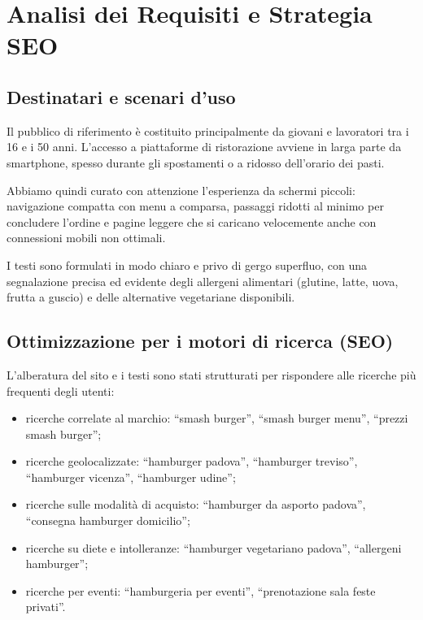\documentclass[a4paper,11pt]{article}
\begin{document}
\section{Analisi dei Requisiti e Strategia SEO}

\subsection{Destinatari e scenari d'uso}
Il pubblico di riferimento è costituito principalmente da giovani e lavoratori tra i 16 e i 50 anni. L'accesso a piattaforme di ristorazione avviene in larga parte da smartphone, spesso durante gli spostamenti o a ridosso dell'orario dei pasti.

Abbiamo quindi curato con attenzione l'esperienza da schermi piccoli: navigazione compatta con menu a comparsa, passaggi ridotti al minimo per concludere l'ordine e pagine leggere che si caricano velocemente anche con connessioni mobili non ottimali.

I testi sono formulati in modo chiaro e privo di gergo superfluo, con una segnalazione precisa ed evidente degli allergeni alimentari (glutine, latte, uova, frutta a guscio) e delle alternative vegetariane disponibili.

\subsection{Ottimizzazione per i motori di ricerca (SEO)}
L'alberatura del sito e i testi sono stati strutturati per rispondere alle ricerche più frequenti degli utenti:
\begin{itemize}
    \item ricerche correlate al marchio: ``smash burger'', ``smash burger menu'', ``prezzi smash burger'';
    \item ricerche geolocalizzate: ``hamburger padova'', ``hamburger treviso'', ``hamburger vicenza'', ``hamburger udine'';
    \item ricerche sulle modalità di acquisto: ``hamburger da asporto padova'', ``consegna hamburger domicilio'';
    \item ricerche su diete e intolleranze: ``hamburger vegetariano padova'', ``allergeni hamburger'';
    \item ricerche per eventi: ``hamburgeria per eventi'', ``prenotazione sala feste privati''.
\end{itemize}
\end{document}

